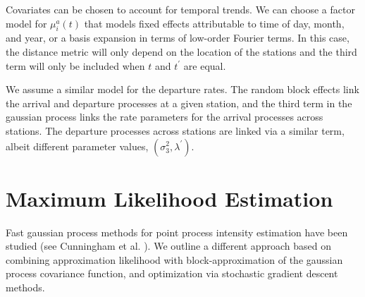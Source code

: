 \documentclass{acm_proc_article-sp}
\begin{document}
Covariates can be chosen to account for temporal trends.  We can choose a factor model for $\mu_i^{a} (t)$ that models fixed effects attributable to time of day, month, and year, or a basis expansion in terms of low-order Fourier terms.  In this case, the distance metric will only depend on the location of the stations and the third term will only be included when $t$ and $t^\prime$ are equal.

We assume a similar model for the departure rates.  The random block effects link the arrival and departure processes at a given station, and the third term in the gaussian process links the rate parameters for the arrival processes across stations.  The departure processes across stations are linked via a similar term, albeit different parameter values, $(\sigma_3^2, \lambda^\prime)$.

\section{Maximum Likelihood Estimation}

Fast gaussian process methods for point process intensity estimation have been studied (see Cunningham et al. \cite{cunningham:fastppest}).  We outline a different approach based on combining approximation likelihood with block-approximation of the gaussian process covariance function, and optimization via stochastic gradient descent methods.
\end{document}
